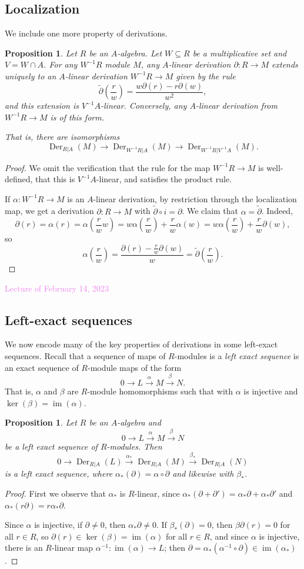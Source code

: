 \documentclass{amsart}[12pt]
\def\Der{\operatorname{Der}}
\def\image{\operatorname{im}}
\def\im{\image}
\def\ker{\operatorname{ker}}
\newcommand{\Feb}[1]{\textcolor{violet}{Lecture of February #1, 2023}}
\numberwithin{equation}{section}
\theoremstyle{plain} %
\newtheorem{prop}[equation]{Proposition}
\theoremstyle{definition}
\theoremstyle{remark}
\newcommand{\ssec}[1]{\subsection{#1}}
\newcommand{\xra}[1]{\xrightarrow{#1}}
\begin{document}
\ssec{Localization}
 We include one more property of derivations.
 
 \begin{prop} Let $R$ be an $A$-algebra. Let $W \subseteq R$ be a multiplicative set and $V=W\cap A$. For any $W^{-1}R$ module $M$, any $A$-linear derivation $\partial:R\to M$ extends uniquely to an $A$-linear derivation $W^{-1}R \to M$ given by the rule
 \[\widetilde{\partial}\left(\frac{r}{w}\right) = \frac{w \partial(r) - r\partial(w)}{w^2},\]
 and this extension is $V^{-1}A$-linear. Conversely, any $A$-linear derivation from $W^{-1}R \to M$ is of this form.
 
 That is, there are isomorphisms
 \[ \Der_{R|A}(M) \to  \Der_{W^{-1}R|A}(M) \to  \Der_{W^{-1}R|V^{-1}A}(M).\]
 \end{prop}
 \begin{proof}
 We omit the verification that the rule for the map $W^{-1}R \to M$ is well-defined, that this is $V^{-1}A$-linear, and satisfies the product rule. 
 
 If $\alpha:W^{-1}R \to M$ is an $A$-linear derivation, by restriction through the localization map, we get a derivation $\partial:R\to M$ with $\widetilde{\partial} \circ i = \partial$. We claim that $\alpha=\widetilde{\partial}$. Indeed, \[ \partial(r) = \alpha(r) = \alpha(\frac{r}{w} w) = w \alpha(\frac{r}{w}) + \frac{r}{w} \alpha(w) =  w \alpha(\frac{r}{w}) + \frac{r}{w} \partial(w), \]
 so \[\alpha (\frac{r}{w}) = \frac{ \partial(r)-\frac{r}{w} \partial(w) }{w} = \widetilde{\partial}(\frac{r}{w}).\]
 \end{proof}


\Feb{14}

\ssec{Left-exact sequences}

We now encode many of the key properties of derivations in some left-exact sequences. Recall that a sequence of maps of $R$-modules is  a \emph{left exact sequence} is an exact sequence of $R$-module maps of the form
\[ 0\to L \xra{\alpha} M \xra{\beta} N.\]
That is, $\alpha$ and $\beta$ are $R$-module homomorphisms such that
with $\alpha$  is injective and $\ker(\beta)=\im(\alpha)$.

\begin{prop} Let $R$ be an $A$-algebra and
\[ 0\to L \xra{\alpha} M \xra{\beta} N\]
be a left exact sequence of $R$-modules. Then
\[ 0\to \Der_{R|A}(L) \xra{\alpha_*} \Der_{R|A}(M) \xra{\beta_*} \Der_{R|A}(N)\]
is a left exact sequence, where $\alpha_*(\partial) = \alpha\circ \partial$ and likewise with $\beta_*$.
\end{prop}
\begin{proof} First we observe that $\alpha_*$ is $R$-linear, since $\alpha_*(\partial+\partial') = \alpha_*\partial + \alpha_*\partial'$ and $\alpha_*(r\partial) = r\alpha_*\partial$. 

Since $\alpha$ is injective, if $\partial\neq 0$, then $\alpha_*\partial\neq 0$. If $\beta_*(\partial)=0$, then $\beta \partial (r)=0$ for all $r\in R$, so $\partial(r)\in \ker(\beta)=\im(\alpha)$ for all $r\in R$, and since $\alpha$ is injective, there is an $R$-linear map $\alpha^{-1}:\im(\alpha) \to L$; then $\partial = \alpha_*(\alpha^{-1} \circ \partial) \in \im(\alpha_*)$.
\end{proof}
\end{document}
